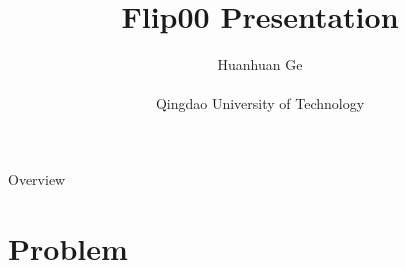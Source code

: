 \documentclass[
 size=12pt,
 paper=smartboard,  %
 mode=present, 		%
 display=slides, 	%
 style=tuliplab,  	%
 pauseslide,
 fleqn,leqno]{powerdot}
\title{Flip00 Presentation}
\author{
Huanhuan Ge
\\
\\Qingdao University of Technology
}
\date{\gitCommitterDate}
\begin{document}
\maketitle



\begin{slide}[toc=,bm=]{Overview}
\begin{spacing}{1.00}
\tableofcontents[content=currentsection,type=1]
\end{spacing}
\end{slide}


\section{Problem}
\end{document}
